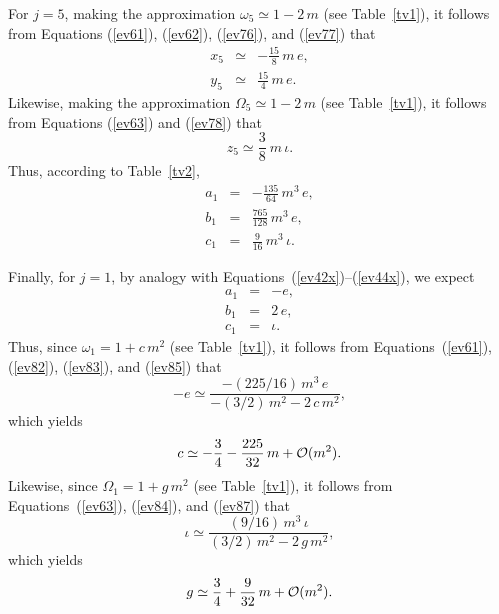  For $j=5$, making the approximation $\omega_5\simeq 1-2\,m$ (see Table~\ref{tv1}), it follows from Equations (\ref{ev61}), (\ref{ev62}), (\ref{ev76}), and (\ref{ev77}) that
 \begin{eqnarray}
 x_5&\simeq & -\frac{15}{8}\,m\,e,\\[0.5ex]
 y_5 &\simeq & \frac{15}{4}\,m\,e.
 \end{eqnarray}
 Likewise, making the approximation $\Omega_5\simeq 1-2\,m$  (see Table~\ref{tv1}), it follows from Equations  (\ref{ev63})
  and (\ref{ev78}) that
 \begin{equation}
 z_5\simeq  \frac{3}{8}\ m\,\iota.
 \end{equation}
 Thus, according to Table~\ref{tv2}, 
 \begin{eqnarray}
 a_1 &=&-\frac{135}{64}\,m^3\,e,\label{ev82}\\[0.5ex]
 b_1 &=&\frac{765}{128}\,m^3\,e,\label{ev83}\\[0.5ex]
 c_1 &=& \frac{9}{16}\,m^3\,\iota.\label{ev84}
 \end{eqnarray}
 
 Finally, for $j=1$, by analogy with Equations~(\ref{ev42x})--(\ref{ev44x}), we expect
 \begin{eqnarray}
 a_1 &=& -e,\label{ev85}\\[0.5ex]
 b_1 &=& 2\,e,\label{ev86}\\[0.5ex]
 c_1 &=& \iota.\label{ev87}
 \end{eqnarray}
 Thus, since $\omega_1=1+c\,m^2$ (see Table~\ref{tv1}), it follows from Equations~(\ref{ev61}), (\ref{ev82}),  (\ref{ev83}),
 and (\ref{ev85}) 
 that
 \begin{equation}
 -e \simeq \frac{ - (225/16)\,m^3\,e}{-(3/2)\,m^2-2\,c\,m^2},
 \end{equation}
 which yields
 \begin{equation}\label{ev89}
 c \simeq- \frac{3}{4} - \frac{225}{32}\,m + {\cal O}(m^2).
 \end{equation}
 Likewise, since 
$\Omega_1=1+g\,m^2$ (see Table~\ref{tv1}), it follows from Equations~(\ref{ev63}), (\ref{ev84}),   and (\ref{ev87})
 that
 \begin{equation}
 \iota \simeq \frac{ (9/16)\,m^3\,\iota}{(3/2)\,m^2-2\,g\,m^2},
 \end{equation}
 which yields
 \begin{equation}\label{ev91}
 g \simeq \frac{3}{4} + \frac{9}{32}\,m + {\cal O}(m^2).
 \end{equation}
 
